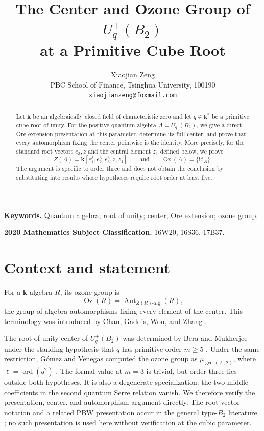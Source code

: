 \documentclass[11pt]{article}
\title{The Center and Ozone Group of $U_q^+(B_2)$\\at a Primitive Cube Root}
\author{Xiaojian Zeng\\
PBC School of Finance, Tsinghua University, 100190\\
\texttt{xiaojianzeng@foxmail.com}}
\date{}
\newcommand{\Oz}{\operatorname{Oz}}
\newcommand{\Aut}{\operatorname{Aut}}
\newcommand{\id}{\mathrm{id}}
\newcommand{\kk}{\mathbf{k}}
\begin{document}
\maketitle

\begin{abstract}
Let $\kk$ be an algebraically closed field of characteristic zero and let $q\in\kk^*$
be a primitive cube root of unity.  For the positive quantum algebra
$A=U_q^+(B_2)$, we give a direct Ore-extension presentation at this
parameter, determine its full center, and prove that every automorphism fixing
the center pointwise is the identity.  More precisely, for the standard root
vectors $e_3,z$ and the central element $z_1$ defined below, we prove
\[
 Z(A)=\kk[e_1^3,e_2^3,e_3^3,z,z_1]
 \qquad\text{and}\qquad
 \Oz(A)=\{\id_A\}.
\]
The argument is specific to order three and does not obtain the conclusion by
substituting into results whose hypotheses require root order at least five.
\end{abstract}

\noindent\textbf{Keywords.}
Quantum algebra; root of unity; center; Ore extension; ozone group.

\medskip
\noindent\textbf{2020 Mathematics Subject Classification.}
16W20, 16S36, 17B37.

\section{Context and statement}

For a $\kk$-algebra $R$, its ozone group is
\[
 \Oz(R)=\Aut_{Z(R)\text{-alg}}(R),
\]
the group of algebra automorphisms fixing every element of the center.  This
terminology was introduced by Chan, Gaddis, Won, and Zhang
\cite{ChanGaddisWonZhang2024}.

The root-of-unity center of $U_q^+(B_2)$ was determined by Bera and
Mukherjee under the standing hypothesis that $q$ has primitive order
$m\geq 5$ \cite[Theorem~9.2]{BeraMukherjee2026}.  Under the same restriction,
G\'omez and Venegas computed the ozone group as
$\mu_{\gcd(\ell,2)}$, where $\ell=\operatorname{ord}(q^2)$
\cite[Theorem~3.7]{GomezVenegas2026}.  The formal value at $m=3$ is trivial,
but order three lies outside both hypotheses.  It is also a degenerate
specialization: the two middle coefficients in the second quantum Serre
relation vanish.  We therefore verify the presentation, center, and
automorphism argument directly.  The root-vector notation and a related PBW
presentation occur in the general type-$B_2$ literature
\cite[Section~3.1.2]{AndruskiewitschDumas2008}; no such presentation is used
here without verification at the cubic parameter.
\end{document}
